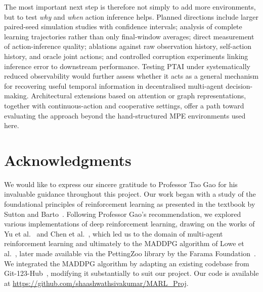 \documentclass[12pt]{article}
\begin{document}
The most important next step is therefore not simply to add more environments, but to test
\emph{why} and \emph{when} action inference helps. Planned directions include larger
paired-seed simulation studies with confidence intervals; analysis of complete learning
trajectories rather than only final-window averages; direct measurement of action-inference
quality; ablations against raw observation history, self-action history, and oracle joint
actions; and controlled corruption experiments linking inference error to downstream
performance. Testing PTAI under systematically reduced observability would further assess
whether it acts as a general mechanism for recovering useful temporal information in
decentralised multi-agent decision-making. Architectural extensions based on attention or
graph representations, together with continuous-action and cooperative settings, offer a
path toward evaluating the approach beyond the hand-structured MPE environments used here.

\section*{Acknowledgments}

We would like to express our sincere gratitude to Professor Tao Gao for his invaluable
guidance throughout this project. Our work began with a study of the foundational
principles of reinforcement learning as presented in the textbook by Sutton and
Barto~\cite{sutton2018reinforcement}. Following Professor Gao's recommendation, we
explored various implementations of deep reinforcement learning, drawing on the works
of Yu et al.~\cite{yu2021surprising} and Chen et al.~\cite{chen2016decentralized}, which
led us to the domain of multi-agent reinforcement learning and ultimately to the MADDPG
algorithm of Lowe et al.~\cite{lowe2017multi}, later made available via the PettingZoo
library by the Farama Foundation~\cite{terry2021pettingzoo}. We integrated the MADDPG
algorithm by adapting an existing codebase from Git-123-Hub~\cite{git123hub2021},
modifying it substantially to suit our project. Our code is available at
\url{https://github.com/shaashwathsivakumar/MARL_Proj}.
\end{document}
